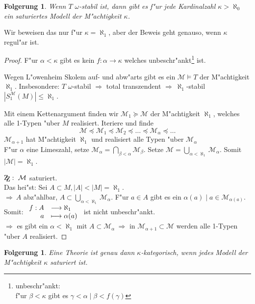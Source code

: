 \documentclass[a4paper,12pt,numbers=noenddot,parskip=full]{scrartcl}
\newcommand{\scrM}{\mathcal{M}}
\newcommand{\zz}{\mathrm{Z\kern-.3em\raise-0.5ex\hbox{Z}}:~}
\theoremstyle{dotless}
\newtheorem{corollary}[theorem]{Folgerung}
\begin{document}
\begin{corollary}
	Wenn $T$ $\omega$-stabil ist, dann gibt es f"ur jede Kardinalzahl $\kappa> \aleph_0$ ein saturiertes Modell der M"achtigkeit $\kappa$.
\end{corollary}
Wir beweisen das nur f"ur $\kappa = \aleph_1$, aber der Beweis geht genauso, wenn $\kappa$ regul"ar ist.
\begin{proof}
	F"ur $\alpha < \kappa$ gibt es kein $f: \alpha \longrightarrow \kappa$ welches unbeschr"ankt\footnote{unbeschr"ankt:\\f"ur $\beta<\kappa$ gibt es $\gamma < \alpha \mid \beta < f(\gamma)$} ist.
	
	Wegen L"owenheim Skolem auf- und abw"arts %
	gibt es ein $\scrM \models T$ der M"achtigkeit $\aleph_1$. Insbesondere: $T$ $\omega$-stabil $\Rightarrow$ total transzendent $\Rightarrow~ \aleph_1$-stabil\\
	$|S_1^\scrM(M)| \leq \aleph_1$.
	
	Mit einem Kettenargument finden wir $\scrM_1 \succeq \scrM$ der M"achtigkeit $\aleph_1$, welches alle 1-Typen "uber $M$ realisiert. Iteriere und finde
	\begin{equation*}
		\scrM \preceq \scrM_1 \preceq \scrM_2\preceq \dots \preceq \scrM_\alpha \preceq \dots
	\end{equation*}
	$\scrM_{\alpha +1}$ hat M"achtigkeit $\aleph_1$ und realisiert alle Typen "uber $\scrM_\alpha$\\
	F"ur $\alpha$ eine Limeszahl, setze $\scrM_\alpha = \bigcap\limits_{\beta < \alpha} \scrM_\beta$. Setze $\scrM = \bigcup\limits_{\alpha < \aleph_1} \scrM_\alpha$. Somit $|\scrM| = \aleph_1$.
	
	$\zz \scrM$ saturiert.\\
	Das hei"st: Sei $A \subset M, |A|<|M|=\aleph_1$.\\
	$\Rightarrow~ A$ abz"ahlbar, $A \subset \bigcup\limits_{\alpha< \aleph_1} \scrM_\alpha$. F"ur $a \in A$ gibt es ein $\alpha(a) \mid a \in \scrM_{\alpha(a)}$. Somit: $\begin{array}{r l}
		f: A &\longrightarrow \aleph_1\\
		\phantom{f:} a &\longmapsto \alpha(a)
	\end{array}$ ist nicht unbeschr"ankt.\\
	$\Rightarrow$ es gibt ein $\alpha < \aleph_1$ mit $A \subset \scrM_\alpha~ \Rightarrow$ in $\scrM_{\alpha +1} \subset \scrM$ werden alle 1-Typen "uber $A$ realisiert.
\end{proof}
\begin{corollary}
	Eine Theorie ist genau dann $\kappa$-kategorisch, wenn jedes Modell der M"achtigkeit $\kappa$ saturiert ist.
\end{corollary}
\end{document}

